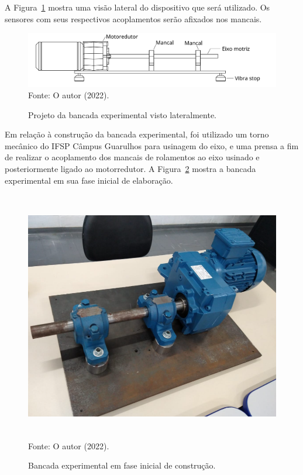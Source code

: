 \documentclass[
	12pt,				
	oneside,			
	a4paper,			
	english,			
	brazil,	
	sumario=abnt-6027-2012		
	]{abntex2ppgsi}
\begin{document}
A Figura~\ref{dispositivo_teste_visto_de_lado} mostra uma visão lateral do dispositivo que será utilizado. Os sensores com seus respectivos acoplamentos serão afixados nos mancais. 

\begin{figure}[H]
\centering
\caption {Projeto da bancada experimental visto lateralmente.}
\includegraphics[width=\textwidth,height=\textheight,keepaspectratio]{dispositivo_teste_visto_de_lado} \\
Fonte: O autor (2022).
\label{dispositivo_teste_visto_de_lado}
\end{figure}

Em relação à construção da bancada experimental, foi utilizado um torno mecânico do IFSP Câmpus Guarulhos para usinagem do eixo, e uma prensa a fim de realizar o acoplamento dos mancais de rolamentos ao eixo usinado e posteriormente ligado ao motorredutor. A Figura~\ref{bancada_de_testes} mostra a bancada experimental em sua fase inicial de elaboração.

\begin{figure}[H]
\centering
\caption {Bancada experimental em fase inicial de construção.}
\includegraphics[width=\textwidth,height=110mm,keepaspectratio]{bancada_de_testes} \\
Fonte: O autor (2022).
\label{bancada_de_testes}
\end{figure}
\end{document}
